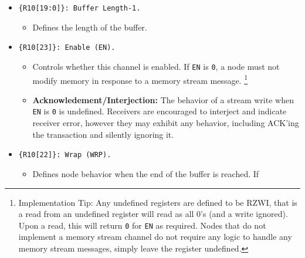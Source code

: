 \begin{itemize}
\begin{itemize}
\begin{itemize}
          reached the halfway point of the stream buffer and double-buffering
          is active for this stream.
        \item The {\tt OVFL} bit is set if the write that generated this alert
          reached the end of the stream buffer and there was already a pending
          alert with the {\tt WRP} bit set or if the write that generated this
          alert reached the halfway point of the stream buffer and double
          buffering is active for this stream and there was already a pending
          alert with the {\tt DBLB} bit set.
      \end{itemize}
    \item \hl{TODO: What happens if a node wishes to alert itself? e.g. a CPU
        that puts itself to sleep but wants to be interrupted when 1,000
      samples have been written to memory?}
    \end{itemize}
  \item {\tt \{R10[19:0]\}: Buffer Length-1.}
    \begin{itemize}
      \item Defines the length of the buffer.
    \end{itemize}
  \item {\tt \{R10[23]\}: Enable (EN).}
    \begin{itemize}
      \item Controls whether this channel is enabled. If {\tt EN} is {\tt 0},
        a node must not modify memory in response to a memory stream message.%
        \footnote{
          Implementation Tip: Any undefined \proto registers are defined to be
          RZWI, that is a read from an undefined register will read as all 0's
          (and a write ignored). Upon a read, this will return {\tt 0} for
          {\tt EN} as required.  Nodes that do not implement a memory stream
          channel do not require any logic to handle any memory stream
          messages, simply leave the register undefined.
        }
      \item {\bf Acknowledement/Interjection:} The behavior of a stream write
        when {\tt EN} is {\tt 0} is undefined. Receivers are encouraged to
        interject and indicate receiver error, however they may exhibit any
        behavior, including ACK'ing the transaction and silently ignoring it.
    \end{itemize}
  \item {\tt \{R10[22]\}: Wrap (WRP).}
    \begin{itemize}
      \item Defines node behavior when the end of the buffer is reached. If

\end{itemize}
\end{itemize}
